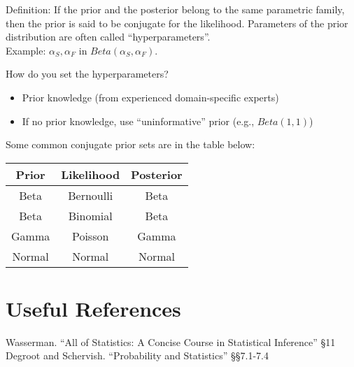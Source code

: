 \begin{aside}
Definition: If the prior and the posterior belong to the same parametric family, 
then the prior is said to be conjugate for the likelihood.
Parameters of the prior distribution
are often called ``hyperparameters''.\\
Example: $\alpha_S,\alpha_F$ in $Beta(\alpha_S,\alpha_F)$.
\vspace{1em}

How do you set the hyperparameters?
\begin{itemize}
\item Prior knowledge (from experienced domain-specific experts)
\item If no prior knowledge, use “uninformative” prior (e.g., $Beta(1,1)$)
\end{itemize}
\vspace{1em}

Some common conjugate prior sets are in the table below:
\begin{center}\begin{tabular}{|c|c|c|}
\hline
Prior & Likelihood & Posterior\\
\hline\hline
Beta & Bernoulli & Beta\\
Beta & Binomial & Beta\\
Gamma & Poisson & Gamma\\
Normal & Normal & Normal\\
\hline
\end{tabular}\end{center}


\end{aside}

\section*{Useful References}
Wasserman. ``All of Statistics: A Concise Course in Statistical Inference'' \S11
Degroot and Schervish. ``Probability and Statistics''  \S\S7.1-7.4


